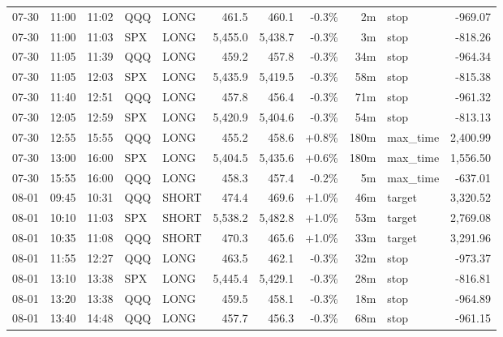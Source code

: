 \documentclass[11pt,a4paper,twoside]{article}
\begin{document}
\begin{center}
\begin{longtable}{>{\color{txtmain}}l l l l l r r r r >{\color{txtmain}}l r}
07-30 & 11:00 & 11:02 & QQQ & LONG & 461.5 & 460.1 & \textcolor{lossred}{-0.3\%} & 2m & stop & \textcolor{lossred}{-969.07} \\
07-30 & 11:00 & 11:03 & SPX & LONG & 5,455.0 & 5,438.7 & \textcolor{lossred}{-0.3\%} & 3m & stop & \textcolor{lossred}{-818.26} \\
07-30 & 11:05 & 11:39 & QQQ & LONG & 459.2 & 457.8 & \textcolor{lossred}{-0.3\%} & 34m & stop & \textcolor{lossred}{-964.34} \\
07-30 & 11:05 & 12:03 & SPX & LONG & 5,435.9 & 5,419.5 & \textcolor{lossred}{-0.3\%} & 58m & stop & \textcolor{lossred}{-815.38} \\
07-30 & 11:40 & 12:51 & QQQ & LONG & 457.8 & 456.4 & \textcolor{lossred}{-0.3\%} & 71m & stop & \textcolor{lossred}{-961.32} \\
07-30 & 12:05 & 12:59 & SPX & LONG & 5,420.9 & 5,404.6 & \textcolor{lossred}{-0.3\%} & 54m & stop & \textcolor{lossred}{-813.13} \\
07-30 & 12:55 & 15:55 & QQQ & LONG & 455.2 & 458.6 & \textcolor{wingreen}{+0.8\%} & 180m & max\_time & \textcolor{wingreen}{2,400.99} \\
07-30 & 13:00 & 16:00 & SPX & LONG & 5,404.5 & 5,435.6 & \textcolor{wingreen}{+0.6\%} & 180m & max\_time & \textcolor{wingreen}{1,556.50} \\
07-30 & 15:55 & 16:00 & QQQ & LONG & 458.3 & 457.4 & \textcolor{lossred}{-0.2\%} & 5m & max\_time & \textcolor{lossred}{-637.01} \\
08-01 & 09:45 & 10:31 & QQQ & SHORT & 474.4 & 469.6 & \textcolor{wingreen}{+1.0\%} & 46m & target & \textcolor{wingreen}{3,320.52} \\
08-01 & 10:10 & 11:03 & SPX & SHORT & 5,538.2 & 5,482.8 & \textcolor{wingreen}{+1.0\%} & 53m & target & \textcolor{wingreen}{2,769.08} \\
08-01 & 10:35 & 11:08 & QQQ & SHORT & 470.3 & 465.6 & \textcolor{wingreen}{+1.0\%} & 33m & target & \textcolor{wingreen}{3,291.96} \\
08-01 & 11:55 & 12:27 & QQQ & LONG & 463.5 & 462.1 & \textcolor{lossred}{-0.3\%} & 32m & stop & \textcolor{lossred}{-973.37} \\
08-01 & 13:10 & 13:38 & SPX & LONG & 5,445.4 & 5,429.1 & \textcolor{lossred}{-0.3\%} & 28m & stop & \textcolor{lossred}{-816.81} \\
08-01 & 13:20 & 13:38 & QQQ & LONG & 459.5 & 458.1 & \textcolor{lossred}{-0.3\%} & 18m & stop & \textcolor{lossred}{-964.89} \\
08-01 & 13:40 & 14:48 & QQQ & LONG & 457.7 & 456.3 & \textcolor{lossred}{-0.3\%} & 68m & stop & \textcolor{lossred}{-961.15} \\

\end{longtable}
\end{center}
\end{document}
